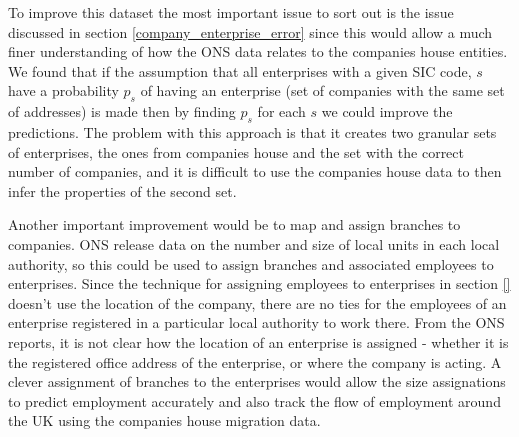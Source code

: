 \documentclass[a4paper,10pt]{article}
\begin{document}
   To improve this dataset the most important issue to sort out is the issue discussed in section \ref{company_enterprise_error} since this would allow a much finer understanding of how the ONS data relates to the companies house entities. We found that if the assumption that all enterprises with a given SIC code, $s$ have a probability $p_s$ of having an enterprise (set of companies with the same set of addresses) is made then by finding $p_s$ for each $s$ we could improve the predictions. The problem with this approach is that it creates two granular sets of enterprises, the ones from companies house and the set with the correct number of companies, and it is difficult to use the companies house data to then infer the properties of the second set.

   Another important improvement would be to map and assign branches to companies. ONS release data on the number and size of local units in each local authority, so this could be used to assign branches and associated employees to enterprises. Since the technique for assigning employees to enterprises in section \ref{} doesn't use the location of the company, there are no ties for the employees of an enterprise registered in a particular local authority to work there. From the ONS reports, it is not clear how the location of an enterprise is assigned - whether it is the registered office address of the enterprise, or where the company is acting. A clever assignment of branches to the enterprises would allow the size assignations to predict employment accurately and also track the flow of employment around the UK using the companies house migration data.

   \medskip
\end{document}
